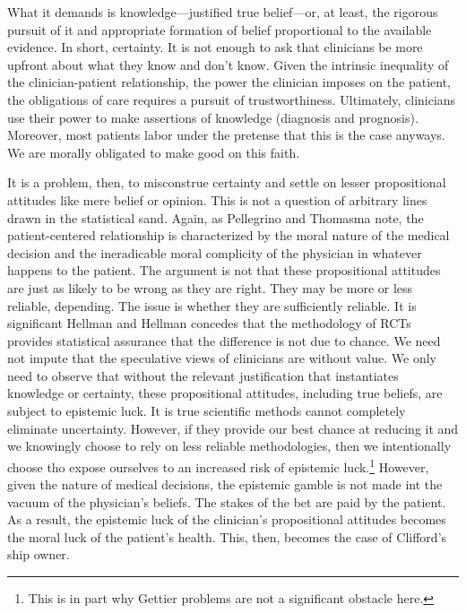 \documentclass[letterpaper,notitlepage,12pt]{article}
\begin{document}
What it demands is knowledge---justified true belief---or, at least, the
rigorous pursuit of it and appropriate formation of belief proportional to the
available evidence.
In short, certainty.
It is not enough to ask that clinicians be more upfront about what they know and
don't know.
Given the intrinsic inequality of the clinician-patient relationship, the power
the clinician imposes on the patient, the obligations of care requires a pursuit
of trustworthiness.
Ultimately, clinicians use their power to make assertions of knowledge
(diagnosis and prognosis).
Moreover, most patients labor under the pretense that this is the case anyways.
We are morally obligated to make good on this faith.

It is a problem, then, to misconstrue certainty and settle on lesser
propositional attitudes like mere belief or opinion.
This is not a question of arbitrary lines drawn in the statistical sand.
Again, as Pellegrino and Thomasma note, the patient-centered relationship is
characterized by the moral nature of the medical decision and the ineradicable
moral complicity of the physician in whatever happens to the patient.
The argument is not that these propositional attitudes are just as likely to be
wrong as they are right.
They may be more or less reliable, depending.
The issue is whether they are sufficiently reliable.
It is significant Hellman and Hellman concedes that the methodology of RCTs
provides statistical assurance that the difference is not due to chance.
We need not impute that the speculative views of clinicians are without value.
We only need to observe that without the relevant justification that
instantiates knowledge or certainty, these propositional attitudes, including
true beliefs, are subject to epistemic luck.
It is true scientific methods cannot completely eliminate uncertainty.
However, if they provide our best chance at reducing it and we knowingly choose
to rely on less reliable methodologies, then we intentionally choose tho expose
ourselves to an increased risk of epistemic luck.\footnote{This is in part why
Gettier problems are not a significant obstacle here.}
However, given the nature of medical decisions, the epistemic gamble is not made
int the vacuum of the physician's beliefs.
The stakes of the bet are paid by the patient.
As a result, the epistemic luck of the clinician's propositional attitudes
becomes the moral luck of the patient's health.
This, then, becomes the case of Clifford's ship owner.
\end{document}
